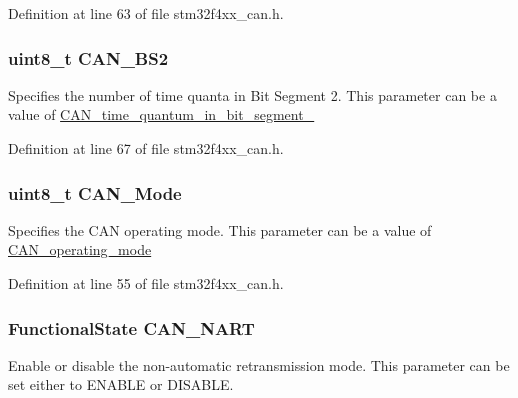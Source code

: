 Definition at line 63 of file stm32f4xx\-\_\-can.\-h.

\hypertarget{struct_c_a_n___init_type_def_a590ee9ab09e8c53d829444bdff407f1c}{
\subsubsection[{C\-A\-N\-\_\-\-B\-S2}]{\setlength{\rightskip}{0pt plus 5cm}uint8\-\_\-t C\-A\-N\-\_\-\-B\-S2}}\label{struct_c_a_n___init_type_def_a590ee9ab09e8c53d829444bdff407f1c}
Specifies the number of time quanta in Bit Segment 2. This parameter can be a value of \hyperlink{group___c_a_n__time__quantum__in__bit__segment__2}{C\-A\-N\-\_\-time\-\_\-quantum\-\_\-in\-\_\-bit\-\_\-segment\-\_} 

Definition at line 67 of file stm32f4xx\-\_\-can.\-h.

\hypertarget{struct_c_a_n___init_type_def_ab06e41b2b56aa5aee6d27bdc07ca1bcf}{
\subsubsection[{C\-A\-N\-\_\-\-Mode}]{\setlength{\rightskip}{0pt plus 5cm}uint8\-\_\-t C\-A\-N\-\_\-\-Mode}}\label{struct_c_a_n___init_type_def_ab06e41b2b56aa5aee6d27bdc07ca1bcf}
Specifies the C\-A\-N operating mode. This parameter can be a value of \hyperlink{group___c_a_n__operating__mode}{C\-A\-N\-\_\-operating\-\_\-mode} 

Definition at line 55 of file stm32f4xx\-\_\-can.\-h.

\hypertarget{struct_c_a_n___init_type_def_ad956a58de0401d8bdd582b5f92c6fa82}{
\subsubsection[{C\-A\-N\-\_\-\-N\-A\-R\-T}]{\setlength{\rightskip}{0pt plus 5cm}Functional\-State C\-A\-N\-\_\-\-N\-A\-R\-T}}\label{struct_c_a_n___init_type_def_ad956a58de0401d8bdd582b5f92c6fa82}
Enable or disable the non-\/automatic retransmission mode. This parameter can be set either to E\-N\-A\-B\-L\-E or D\-I\-S\-A\-B\-L\-E. 

